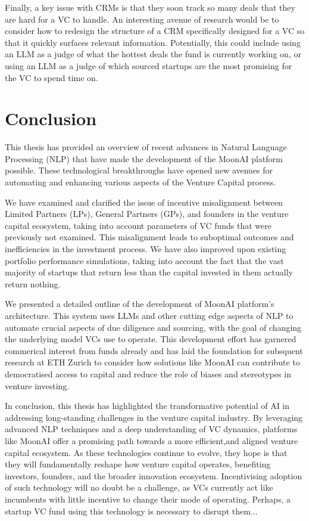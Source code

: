 \documentclass[a4paper, oneside]{discothesis}
\begin{document}
Finally, a key issue with CRMs is that they soon track so many deals that they are hard for a VC to handle. An interesting avenue of research would be to consider how to redesign the structure of a CRM specifically designed for a VC so that it quickly surfaces relevant information. Potentially, this could include using an LLM as a judge of what the hottest deals the fund is currently working on, or using an LLM as a judge of which sourced startups are the most promising for the VC to spend time on. 

\chapter{Conclusion}

This thesis has provided an overview of recent advances in Natural Language Processing (NLP) that have made the development of the MoonAI platform possible. These technological breakthroughs have opened new avenues for automating and enhancing various aspects of the Venture Capital process.

We have examined and clarified the issue of incentive misalignment between Limited Partners (LPs), General Partners (GPs), and founders in the venture capital ecosystem, taking into account parameters of VC funds that were previously not examined. This misalignment leads to suboptimal outcomes and inefficiencies in the investment process. We have also improved upon existing portfolio performance simulations, taking into account the fact that the vast majority of startups that return less than the capital invested in them actually return nothing.

We presented a detailed outline of the development of MoonAI platform's architecture. This system uses LLMs and other cutting edge aspects of NLP to automate crucial aspects of due diligence and sourcing, with the goal of changing the underlying model VCs use to operate. This development effort has garnered commerical interest from funds already and has laid the foundation for subsquent research at ETH Zurich to consider how solutions like MoonAI can contribute to democratised access to capital and reduce the role of biases and stereotypes in venture investing. 

In conclusion, this thesis has highlighted the transformative potential of AI in
addressing long-standing challenges in the venture capital industry. By leveraging
advanced NLP techniques and a deep understanding of VC dynamics, platforms
like MoonAI offer a promising path towards a more efficient,and aligned venture
capital ecosystem. As these technologies continue to evolve, they hope is that they
will fundamentally reshape how venture capital operates, benefiting investors,
founders, and the broader innovation ecosystem. Incentivising adoption of such
technology will no doubt be a challenge, as VCs currently act like incumbents
with little incentive to change their mode of operating. Perhaps, a startup VC
fund using this technology is necessary to disrupt them...
\end{document}
